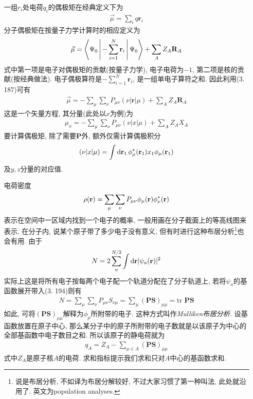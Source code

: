 一组$r_i$处电荷$q_i$的偶极矩在经典定义下为
\begin{align}
	\vec{\mu} = \sum_i q\mathbf{r}_i
\end{align}
分子偶极矩在按量子力学计算时的相应定义为
\begin{align}
	\vec{\mu} = \Braket{\Psi_0|-\sum_{i=1}^{N}\mathbf{r}_i|\Psi_0} + \sum_AZ_A\mathbf{R}_A
\end{align}
式中第一项是电子对偶极矩的贡献(按量子力学), 
电子电荷为$-1$, 
第二项是核的贡献(按经典做法). 
电子偶极算符是$-\sum_{i=1}^{N}\mathbf{r}_i$, 
是一组单电子算符之和. 
因此利用(3.
187)可有
\begin{align}
	\vec{\mu} = -\sum_\mu\sum_\nu P_{\mu\nu}(\nu|\mathbf{r}|\mu) + \sum_AZ_A\mathbf{R}_A
\end{align}
这是一个矢量方程, 
其分量(此处以$x$为例)为
\begin{align}
	\mu_x = -\sum_\mu\sum_\nu P_{\mu\nu}(\nu|x|\mu) + \sum_AZ_AX_A
\end{align}
要计算偶极矩, 
除了需要$\mathbf{P}$外, 
额外仅需计算偶极积分
\begin{align}
	(\nu|x|\mu) = \int\dd{r}_1\,\phi_\mu^*(\bfr_1)x_1\phi_\mu(\bfr_1)
\end{align}
及$y,z$分量的对应值.


电荷密度
\begin{align}
	\rho(\mathbf{r}) = \sum_\mu\sum_\nu P_{\mu\nu}\phi_\mu(\mathbf{r})\phi_\nu^*(\mathbf{r})
\end{align}
表示在空间中一区域内找到一个电子的概率, 一般用画在分子截面上的等高线图来表示. 
在分子内, 说某个原子带了多少电子没有意义, 但有时进行这种布居分析\footnote{
	说是布居分析, 
	不如译为布居分解较好, 
	不过大家习惯了第一种叫法, 
	此处就沿用了. 
	英文为population analyses.
	
}也会有用. 由于
\begin{align}
	N = 2\sum_{a}^{N/2}\int\dd{r}|\psi_a(\bfr)|^2
\end{align}
实际上这是将所有电子按每两个电子配一个轨道分配在了分子轨道上, 
若将$\psi_a$的基函数展开带入(3.
194)则有
\begin{align}
	N = \sum_\mu\sum_\nu P_{\mu\nu}S_{\nu\mu} = \sum_\mu(\mathbf{PS})_{\mu\mu} = \mathrm{tr}\,\,\mathbf{PS}
\end{align}
如此, 
可将$(\mathbf{PS})_{\mu\mu}$解释为$\phi_\mu$所附带的电子. 
这种方式叫作\emph{Mulliken布居分析}. 
设基函数放置在原子中心, 
那么某分子中的原子所附带的电子数就是以该原子为中心的全部基函数中电子数目之和. 
所以该原子的静电荷就为
\begin{align}
	q_A = Z_A - \sum_{\mu\in A}(\mathbf{PS})_{\mu\mu}
\end{align}
式中$Z_A$是原子核$A$的电荷. 
求和指标提示我们求和只对$A$中心的基函数求和.


